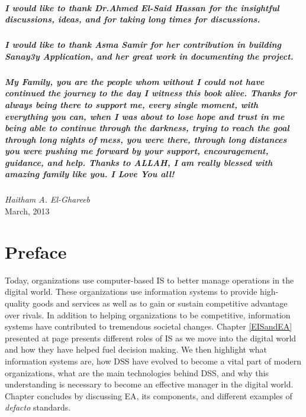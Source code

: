\documentclass[12pt,a4paper,final,twoside,onecolumn,titlepage]{book}
\begin{document}
\paragraph*{I would like to thank Dr.Ahmed El-Said Hassan for the insightful discussions, ideas, and for taking long times for discussions.}

\paragraph*{I would like to thank Asma Samir for her contribution in building Sanay3y Application, and her great work in documenting the project.}

\paragraph*{My Family, you are the people whom without I could not have continued the journey to the day I witness this book alive. Thanks for always being there to support me, every single moment, with everything you can, when I was about to lose hope and trust in me being able to continue through the darkness, trying to reach the goal through long nights of mess, you were there, through long distances you were pushing me forward by your support, encouragement, guidance, and help. Thanks to ALLAH, I am really blessed with amazing family like you. I Love You all!}

\thispagestyle{empty}

\begin{flushright}
\textit{Haitham A. El-Ghareeb} \\
March, 2013
\end{flushright}

\cleardoublepage
{}
\listoffigures
\listoftables
\tableofcontents

\chapter{Preface}
Today, organizations use computer-based \gls{IS} to better manage operations in the digital world. These organizations use information systems to provide high-quality goods and services as well as to gain or sustain competitive advantage over rivals. In addition to helping organizations to be competitive, information systems have contributed to tremendous societal changes. Chapter \ref{EISandEA} presented at page \pageref{EISandEA} presents different roles of \gls{IS} as we move into the digital world and how they have helped fuel decision making. We then highlight what information systems are, how \gls{DSS} have evolved to become a vital part of modern organizations, what are the main technologies behind \gls{DSS}, and why this understanding is necessary to become an effective manager in the digital world. Chapter concludes by discussing \gls{EA}, its components, and different examples of \textit{defacto} standards.
\end{document}
